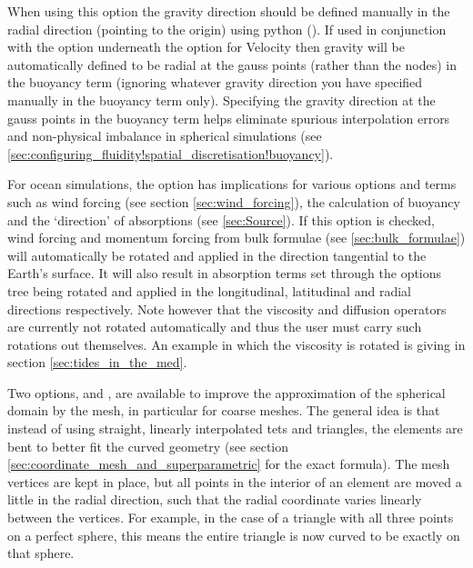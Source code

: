 When using this option the gravity direction should be defined manually in the radial
direction (pointing to the origin) using python
().  If used in conjunction with the
 option underneath the  option for
Velocity then gravity will be automatically defined to be radial at the gauss points (rather than the nodes) in the buoyancy term
(ignoring whatever gravity direction you have specified manually in the buoyancy term only).  Specifying the gravity direction at the
gauss points in the buoyancy term helps eliminate spurious interpolation errors and non-physical imbalance in spherical simulations (see
\ref{sec:configuring_fluidity!spatial_discretisation!buoyancy}).

For ocean simulations, the option has implications for various options and terms such as wind forcing (see section \ref{sec:wind_forcing}), the calculation of buoyancy and the `direction' of absorptions (see \ref{sec:Source}).
If this option is checked, wind forcing and \eg momentum forcing from bulk formulae (see \ref{sec:bulk_formulae}) will automatically be rotated and applied in the direction tangential to the Earth's surface. It will also result in absorption terms set through the options tree being rotated and applied in the longitudinal, latitudinal and radial directions respectively. Note however that the viscosity and diffusion operators are currently not rotated automatically and thus the user must carry such rotations out themselves. An example in which the viscosity is rotated is giving in section \ref{sec:tides_in_the_med}.

Two options,  and
,
are available to improve the approximation of the spherical domain
by the mesh, in particular for coarse meshes.
The general idea is that instead of using straight, linearly
interpolated tets and triangles, the elements are bent to better fit the curved
geometry (see section \ref{sec:coordinate_mesh_and_superparametric} for the
exact formula). The mesh vertices are kept in place, but all points in the interior of
an element are moved a little in the radial direction,
such that the radial coordinate varies linearly
between the vertices. For example, in the case of a triangle with all three
points on a perfect sphere, this means the entire triangle is now curved
to be exactly on that sphere. 

